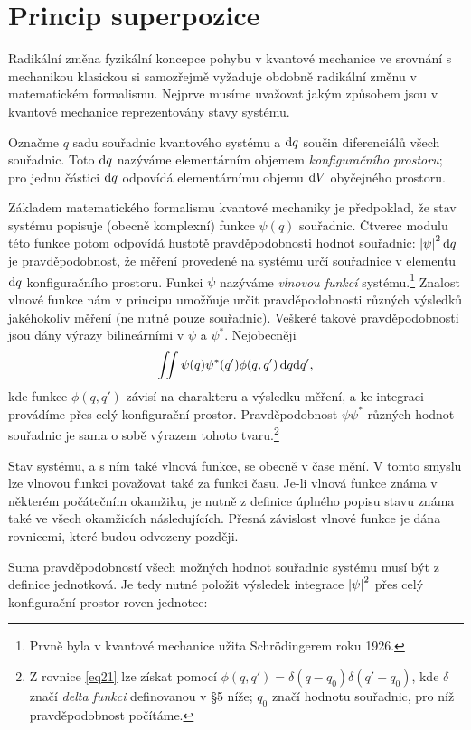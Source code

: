 \section{Princip superpozice}
Radikální změna fyzikální koncepce pohybu v kvantové mechanice ve srovnání s mechanikou klasickou si samozřejmě vyžaduje obdobně radikální změnu v matematickém formalismu. Nejprve musíme uvažovat jakým způsobem jsou v kvantové mechanice reprezentovány stavy systému.\par
Označme \(q\) sadu souřadnic kvantového systému a \(\mathrm{d} q\) součin diferenciálů všech souřadnic. Toto \(\mathrm{d} q\) nazýváme elementárním objemem \emph{konfiguračního prostoru}; pro jednu částici \(\mathrm{d} q\) odpovídá elementárnímu objemu \(\mathrm{d} V\) obyčejného prostoru.\par
Základem matematického formalismu kvantové mechaniky je předpoklad, že stav systému popisuje (obecně komplexní) funkce \(\psi(q)\) souřadnic. Čtverec modulu této funkce potom odpovídá hustotě pravděpodobnosti hodnot souřadnic: \(\left|\psi\right|^2\mathrm{d} q\) je pravděpodobnost, že měření provedené na systému určí souřadnice v elementu \(\mathrm{d} q\) konfiguračního prostoru. Funkci \(\psi\) nazýváme \emph{vlnovou funkcí} systému.\footnote{Prvně byla v kvantové mechanice užita Schrödingerem roku 1926.} Znalost vlnové funkce nám v principu umožňuje určit pravděpodobnosti různých výsledků jakéhokoliv měření (ne nutně pouze souřadnic). Veškeré takové pravděpodobnosti jsou dány výrazy bilineárními v \(\psi\) a \(\psi^*\). Nejobecněji
\begin{equation}\label{eq21}
    \iint \psi(q)\psi^*(q')\phi(q,q')\,\mathrm{d} q\mathrm{d} q',
\end{equation}
kde funkce \(\phi(q,q')\) závisí na charakteru a výsledku měření, a ke integraci provádíme přes celý konfigurační prostor. Pravděpodobnost \(\psi\psi^*\) různých hodnot souřadnic je sama o sobě výrazem tohoto tvaru.\footnote{Z rovnice \eqref{eq21} lze získat pomocí \(\phi(q,q')=\delta(q-q_0)\delta(q'-q_0)\), kde \(\delta\) značí \emph{delta funkci} definovanou v §5 níže; \(q_0\) značí hodnotu souřadnic, pro níž pravděpodobnost počítáme.}\par
Stav systému, a s ním také vlnová funkce, se obecně v čase mění. V tomto smyslu lze vlnovou funkci považovat také za funkci času. Je-li vlnová funkce známa v některém počátečním okamžiku, je nutně z definice úplného popisu stavu známa také ve všech okamžicích následujících. Přesná závislost vlnové funkce je dána rovnicemi, které budou odvozeny později.\par
Suma pravděpodobností všech možných hodnot souřadnic systému musí být z definice jednotková. Je tedy nutné položit výsledek integrace \(\left|\psi\right|^2\) přes celý konfigurační prostor roven jednotce:
